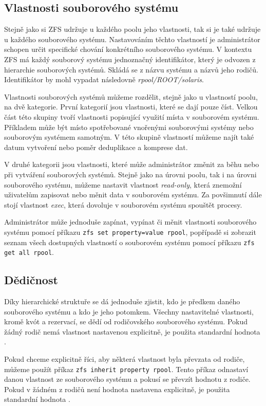 \subsection{Vlastnosti souborového systému}
Stejně jako si ZFS udržuje u každého poolu jeho vlastnosti, tak si je také udržuje u každého souborového systému. Nastavováním těchto vlastností je administrátor schopen určit specifické chování konkrétního souborového systému. V kontextu ZFS má každý souborový systému jednoznačný identifikátor, který je odvozen z hierarchie souborových systémů. Skládá se z názvu systému a názvů jeho rodičů. Identifikátor by mohl vypadat následovně \emph{rpool/ROOT/solaris}.

Vlastnosti souborových systémů můžeme rozdělit, stejně jako u vlastností poolu, na dvě kategorie. První kategorií jsou vlastnosti, které se dají pouze číst. Velkou část této skupiny tvoří vlastnosti popisující využití místa v souborovém systému. Příkladem může být místo spotřebované vnořenými souborovými systémy nebo souborovým systémem samotným. V této skupině vlastností můžeme najít také datum vytvoření nebo poměr deduplikace a komprese dat.

V druhé kategorii jsou vlastnosti, které může administrátor změnit za běhu nebo při vytváření souborových systémů. Stejně jako na úrovni poolu, tak i na úrovni souborového systému, můžeme nastavit vlastnost \emph{read-only}, která znemožní uživatelům zapisovat nebo měnit data v souborovém systému. Za povšimnutí dále stojí vlastnost \emph{exec}, která dovoluje v souborovém systému spouštět procesy.

Administrátor může jednoduše zapínat, vypínat či měnit vlastnosti souborového systému pomocí příkazu \verb|zfs set property=value rpool|, popřípadě si zobrazit seznam všech dostupných vlastností o souborovém systému pomocí příkazu \verb|zfs get all rpool|.

\subsection{Dědičnost}
Díky hierarchické struktuře se dá jednoduše zjistit, kdo je předkem daného souborového systému a kdo je jeho potomkem. Všechny nastavitelné vlastnosti, kromě kvót a rezervací, se dědí od rodičovského souborového systému. Pokud žádný rodič nemá vlastnost nastavenou explicitně, je použita standardní hodnota \cite{inheriting}.

Pokud chceme explicitně říci, aby některá vlastnost byla převzata od rodiče, můžeme použít příkaz \verb|zfs inherit property rpool|. Tento příkaz odnastaví danou vlastnost ze souborového systému a pokusí se převzít hodnotu z rodiče. Pokud v žádném z rodičů není hodnota nastavena explicitně, je použita standardní hodnota \cite{inheriting}.
